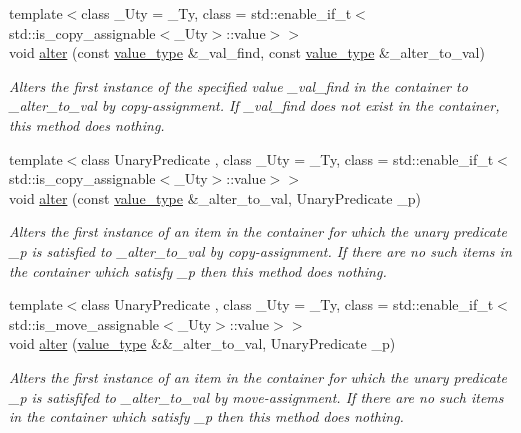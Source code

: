 \begin{DoxyCompactItemize}
{\footnotesize template$<$class \+\_\+\+Uty  = \+\_\+\+Ty, class  = std\+::enable\+\_\+if\+\_\+t$<$std\+::is\+\_\+copy\+\_\+assignable$<$\+\_\+\+Uty$>$\+::value$>$$>$ }\\void \hyperlink{classcrsc_1_1priority__queue_a77fc76e3682abf042bfbdfcce78b41aa}{alter} (const \hyperlink{classcrsc_1_1priority__queue_a2a7d77c9465b6c918f67021e6eb926d7}{value\+\_\+type} \&\+\_\+val\+\_\+find, const \hyperlink{classcrsc_1_1priority__queue_a2a7d77c9465b6c918f67021e6eb926d7}{value\+\_\+type} \&\+\_\+alter\+\_\+to\+\_\+val)
\begin{DoxyCompactList}\small\item\em Alters the first instance of the specified value {\ttfamily \+\_\+val\+\_\+find} in the container to {\ttfamily \+\_\+alter\+\_\+to\+\_\+val} by copy-\/assignment. If {\ttfamily \+\_\+val\+\_\+find} does not exist in the container, this method does nothing. \end{DoxyCompactList}\item 
{\footnotesize template$<$class Unary\+Predicate , class \+\_\+\+Uty  = \+\_\+\+Ty, class  = std\+::enable\+\_\+if\+\_\+t$<$std\+::is\+\_\+copy\+\_\+assignable$<$\+\_\+\+Uty$>$\+::value$>$$>$ }\\void \hyperlink{classcrsc_1_1priority__queue_abe2ae7e923d7bfd53dd79c15d4c4fd26}{alter} (const \hyperlink{classcrsc_1_1priority__queue_a2a7d77c9465b6c918f67021e6eb926d7}{value\+\_\+type} \&\+\_\+alter\+\_\+to\+\_\+val, Unary\+Predicate \+\_\+p)
\begin{DoxyCompactList}\small\item\em Alters the first instance of an item in the container for which the unary predicate {\ttfamily \+\_\+p} is satisfied to {\ttfamily \+\_\+alter\+\_\+to\+\_\+val} by copy-\/assignment. If there are no such items in the container which satisfy {\ttfamily \+\_\+p} then this method does nothing. \end{DoxyCompactList}\item 
{\footnotesize template$<$class Unary\+Predicate , class \+\_\+\+Uty  = \+\_\+\+Ty, class  = std\+::enable\+\_\+if\+\_\+t$<$std\+::is\+\_\+move\+\_\+assignable$<$\+\_\+\+Uty$>$\+::value$>$$>$ }\\void \hyperlink{classcrsc_1_1priority__queue_a87fbb620ca34e1d02480f471717acd40}{alter} (\hyperlink{classcrsc_1_1priority__queue_a2a7d77c9465b6c918f67021e6eb926d7}{value\+\_\+type} \&\&\+\_\+alter\+\_\+to\+\_\+val, Unary\+Predicate \+\_\+p)
\begin{DoxyCompactList}\small\item\em Alters the first instance of an item in the container for which the unary predicate {\ttfamily \+\_\+p} is satisfifed to {\ttfamily \+\_\+alter\+\_\+to\+\_\+val} by move-\/assignment. If there are no such items in the container which satisfy {\ttfamily \+\_\+p} then this method does nothing. \end{DoxyCompactList}\item 

\end{DoxyCompactItemize}
